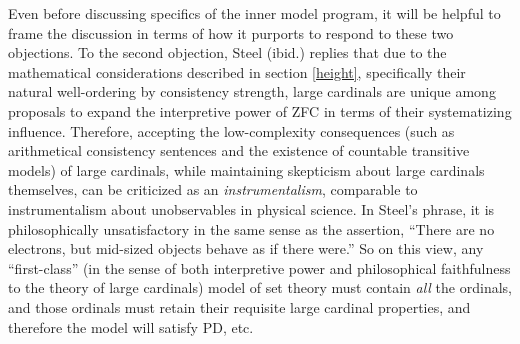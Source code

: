 \documentclass[letterpaper,12pt]{article}
\begin{document}
Even before discussing specifics of the inner model program, it will be helpful to frame the discussion in terms of how it purports to respond to these two objections. To the second objection, Steel (ibid.) replies that due to the mathematical considerations described in section \ref{height}, specifically their natural well-ordering by consistency strength, large cardinals are unique among proposals to expand the interpretive power of ZFC in terms of their systematizing influence. Therefore, accepting the low-complexity consequences (such as arithmetical consistency sentences and the existence of countable transitive models) of large cardinals, while maintaining skepticism about large cardinals themselves, can be criticized as an \emph{instrumentalism}, comparable to instrumentalism about unobservables in physical science. In Steel's \citeyearpar{feferman2000does} phrase, it is philosophically unsatisfactory in the same sense as the assertion, ``There are no electrons, but mid-sized objects behave as if there were.'' So on this view, any ``first-class'' (in the sense of both interpretive power and philosophical faithfulness to the theory of large cardinals) model of set theory must contain \emph{all} the ordinals, and those ordinals must retain their requisite large cardinal properties, and therefore the model will satisfy PD, etc.
\end{document}
